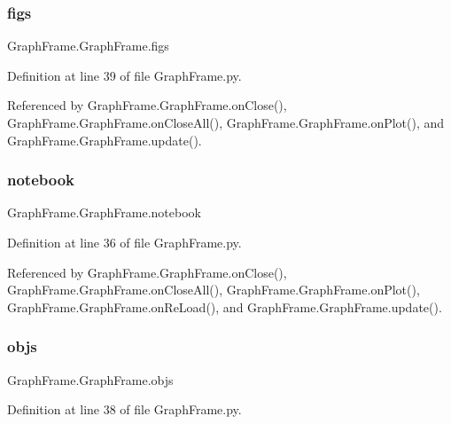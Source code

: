 \subsubsection{\texorpdfstring{figs}{figs}}
{\footnotesize\ttfamily Graph\+Frame.\+Graph\+Frame.\+figs}



Definition at line 39 of file Graph\+Frame.\+py.



Referenced by Graph\+Frame.\+Graph\+Frame.\+on\+Close(), Graph\+Frame.\+Graph\+Frame.\+on\+Close\+All(), Graph\+Frame.\+Graph\+Frame.\+on\+Plot(), and Graph\+Frame.\+Graph\+Frame.\+update().

\mbox{\label{classGraphFrame_1_1GraphFrame_afa157e331c533963e6ad5c8e0e808999}} 
\subsubsection{\texorpdfstring{notebook}{notebook}}
{\footnotesize\ttfamily Graph\+Frame.\+Graph\+Frame.\+notebook}



Definition at line 36 of file Graph\+Frame.\+py.



Referenced by Graph\+Frame.\+Graph\+Frame.\+on\+Close(), Graph\+Frame.\+Graph\+Frame.\+on\+Close\+All(), Graph\+Frame.\+Graph\+Frame.\+on\+Plot(), Graph\+Frame.\+Graph\+Frame.\+on\+Re\+Load(), and Graph\+Frame.\+Graph\+Frame.\+update().

\mbox{\label{classGraphFrame_1_1GraphFrame_a2f83944a4fed433a745817d7bf39550f}} 
\subsubsection{\texorpdfstring{objs}{objs}}
{\footnotesize\ttfamily Graph\+Frame.\+Graph\+Frame.\+objs}



Definition at line 38 of file Graph\+Frame.\+py.



